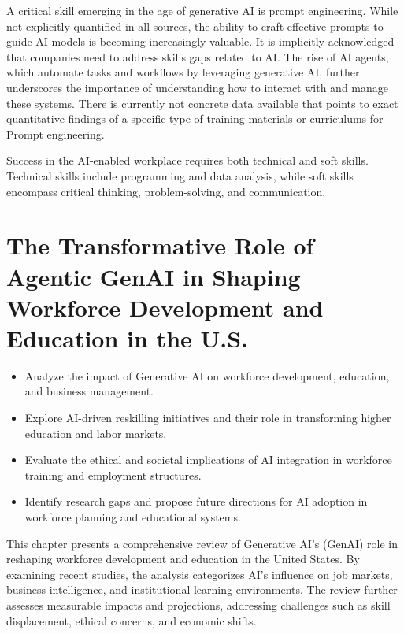 \documentclass[a4paper,headinclude=on,footinclude=on,12pt,oneside]{scrbook}
\begin{document}

A critical skill emerging in the age of generative AI is prompt engineering. While not explicitly quantified in all sources, the ability to craft effective prompts to guide AI models is becoming increasingly valuable. It is implicitly acknowledged that companies need to address skills gaps related to AI. The rise of AI agents, which automate tasks and workflows by leveraging generative AI, further underscores the importance of understanding how to interact with and manage these systems. There is currently not concrete data available that points to exact quantitative findings of a specific type of training materials or curriculums for Prompt engineering.


Success in the AI-enabled workplace requires both technical and soft skills. Technical skills include programming and data analysis, while soft skills encompass critical thinking, problem-solving, and communication. 


\chapter{The Transformative Role of Agentic GenAI in Shaping Workforce Development and Education in the U.S.}

\begin{itemize}
	\item Analyze the impact of Generative AI on workforce development, education, and business management.
	\item Explore AI-driven reskilling initiatives and their role in transforming higher education and labor markets.
	\item Evaluate the ethical and societal implications of AI integration in workforce training and employment structures.
	\item Identify research gaps and propose future directions for AI adoption in workforce planning and educational systems.
\end{itemize}

This chapter presents a comprehensive review of Generative AI's (GenAI) role in reshaping workforce development and education in the United States. By examining recent studies, the analysis categorizes AI's influence on job markets, business intelligence, and institutional learning environments. The review further assesses measurable impacts and projections, addressing challenges such as skill displacement, ethical concerns, and economic shifts.
\end{document}
